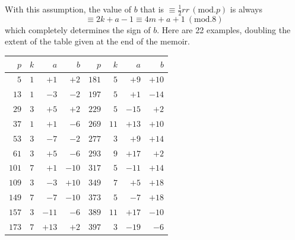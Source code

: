 \endgroup
With this assumption, the value of $b$ that is $\equiv\frac12rr\, (\mathrm{mod}.p)$ is always
\[
{}\equiv2k+a-1\equiv4m+a+1\ (\mathrm{mod}.8)
\]
which completely determines the sign of $b$. Here are 22 examples, doubling the extent of the table given at the end of the memoir.
\begin{center}
\begin{tabular}{r|r|r|r||r|r|r|r}
$p$&$k$&$a$&$b$&$p$&$k$&$a$&$b$\\\hline
$5$&$1$&$+1$&$+2$&$181$&$5$&$+9$&$+10$\\
$13$&$1$&$-3$&$-2$&$197$&$5$&$+1$&$-14$\\
$29$&$3$&$+5$&$+2$&$229$&$5$&$-15$&$+2$\\
$37$&$1$&$+1$&$-6$&$269$&$11$&$+13$&$+10$\\
$53$&$3$&$-7$&$-2$&$277$&$3$&$+9$&$+14$\\
$61$&$3$&$+5$&$-6$&$293$&$9$&$+17$&$+2$\\
$101$&$7$&$+1$&$-10$&$317$&$5$&$-11$&$+14$\\
$109$&$3$&$-3$&$+10$&$349$&$7$&$+5$&$+18$\\
$149$&$7$&$-7$&$-10$&$373$&$5$&$-7$&$+18$\\
$157$&$3$&$-11$&$-6$&$389$&$11$&$+17$&$-10$\\
$173$&$7$&$+13$&$+2$&$397$&$3$&$-19$&$-6$\\
\end{tabular}
\end{center}

